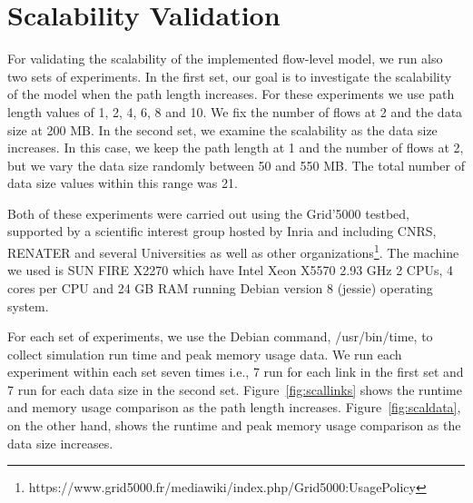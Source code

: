  
\section{Scalability Validation}
For validating the scalability of the implemented flow-level model, we run also two sets of experiments. In the first set, our goal is to investigate the scalability of the model when the path length increases. For these experiments we use path length values of 1, 2, 4, 6, 8 and 10. We fix the number of flows at 2 and the data size at 200 MB. In the second set, we examine the scalability as the data size increases. In this case, we keep the path length at 1 and the number of flows at 2, but we vary the data size randomly between 50 and 550 MB. The total number of data size values within this range was 21. 

Both of these experiments were carried out using the Grid'5000 testbed, supported by a scientific interest group hosted by Inria and including CNRS, RENATER and several Universities as well as other organizations\footnote{https://www.grid5000.fr/mediawiki/index.php/Grid5000:UsagePolicy}. The machine we used is SUN FIRE X2270 which have Intel Xeon X5570 2.93 GHz 2 CPUs, 4 cores per CPU and 24 GB RAM running Debian version 8 (jessie) operating system.

For each set of experiments, we use the Debian command, /usr/bin/time, to collect simulation run time and peak memory usage data. We run each experiment within each set seven times i.e., 7 run for each link in the first set and 7 run for each data size in the second set. Figure~\ref{fig:scallinks} shows the runtime and memory usage comparison as the path length increases. Figure~\ref{fig:scaldata}, on the other hand, shows the runtime and peak memory usage comparison as the data size increases.

